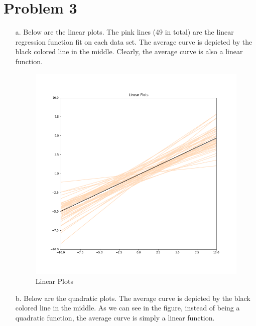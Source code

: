 \documentclass[twoside]{homework}
\begin{document}
\section*{Problem 3}
\begin{itemize}
    \item[a.] Below are the linear plots. The pink lines (49 in total) are the linear regression function fit on each data set. The average curve is depicted by the black colored line in the middle. Clearly, the average curve is also a linear function.
        \begin{figure}[H]
            \includegraphics[scale=0.7]{q3_linear_v2.png}
            \caption{Linear Plots}
            \label{fig:linear_plots}
        \end{figure}
    \item[b.] Below are the quadratic plots. The average curve is depicted by the black colored line in the middle. As we can see in the figure, instead of being a quadratic function, the average curve is simply a linear function.
        \item[]
        \begin{figure}[H]

\end{figure}
\end{itemize}
\end{document}
